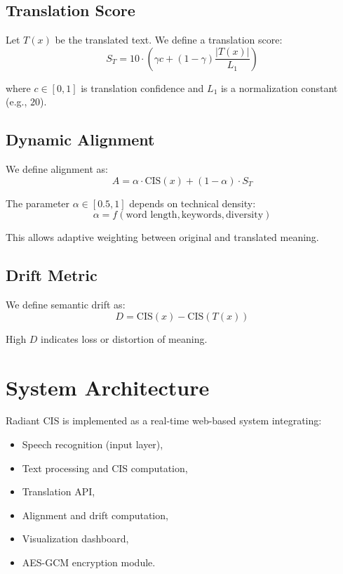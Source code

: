 \documentclass{article}
\begin{document}
\subsection{Translation Score}

Let $T(x)$ be the translated text. We define a translation score:
\begin{equation}
S_T = 10 \cdot \left( \gamma c + (1-\gamma)\frac{|T(x)|}{L_1} \right)
\end{equation}

where $c \in [0,1]$ is translation confidence and $L_1$ is a normalization constant (e.g., $20$).

\subsection{Dynamic Alignment}

We define alignment as:
\begin{equation}
A = \alpha \cdot \text{CIS}(x) + (1 - \alpha)\cdot S_T
\end{equation}

The parameter $\alpha \in [0.5,1]$ depends on technical density:
\begin{equation}
\alpha = f(\text{word length}, \text{keywords}, \text{diversity})
\end{equation}

This allows adaptive weighting between original and translated meaning.

\subsection{Drift Metric}

We define semantic drift as:
\begin{equation}
D = \text{CIS}(x) - \text{CIS}(T(x))
\end{equation}

High $D$ indicates loss or distortion of meaning.

\section{System Architecture}

Radiant CIS is implemented as a real-time web-based system integrating:

\begin{itemize}[noitemsep]
    \item Speech recognition (input layer),
    \item Text processing and CIS computation,
    \item Translation API,
    \item Alignment and drift computation,
    \item Visualization dashboard,
    \item AES-GCM encryption module.
\end{itemize}
\end{document}
